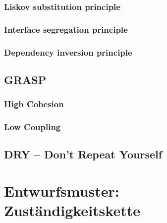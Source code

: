 \documentclass[12pt,a4paper,titlepage,ngerman,pdftex]{report}
\begin{document}
    \subsubsection{Liskov substitution principle}

    \subsubsection{Interface segregation principle}

    \subsubsection{Dependency inversion principle}

    \subsection{GRASP}

    \subsubsection{High Cohesion}

    \subsubsection{Low Coupling}
    
    \subsection{DRY -- Don't Repeat Yourself}

    \section{Entwurfsmuster: Zuständigkeitskette}\label{sec:entwurfsmuster}
\end{document}
